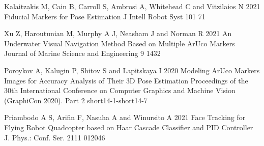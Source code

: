\documentclass[a4paper]{jpconf}
\begin{document}
\begin{thebibliography}{12}
     Kalaitzakis M, Cain B, Carroll S, Ambrosi A, Whitehead C and Vitzilaios N 2021 Fiducial Markers for Pose Estimation J Intell Robot Syst 101 71

     Xu Z, Haroutunian M, Murphy A J, Neasham J and Norman R 2021 An Underwater Visual Navigation Method Based on Multiple ArUco Markers Journal of Marine Science and Engineering 9 1432

     Poroykov A, Kalugin P, Shitov S and Lapitskaya I 2020 Modeling ArUco Markers Images for Accuracy Analysis of Their 3D Pose Estimation Proceedings of the 30th International Conference on Computer Graphics and Machine Vision (GraphiCon 2020). Part 2 short14-1-short14-7

     Priambodo A S, Arifin F, Nasuha A and Winursito A 2021 Face Tracking for Flying Robot Quadcopter based on Haar Cascade Classifier and PID Controller J. Phys.: Conf. Ser. 2111 012046
\end{thebibliography}
\end{document}
